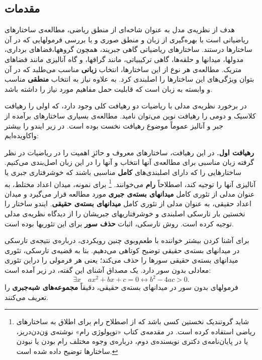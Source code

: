 \documentclass[12pt,a4paper]{article}
\theoremstyle{colorhead}
\begin{document}
\subsection{مقدمات}
هدف از
نظریه‌ی مدل 
به عنوان شاخه‌ای
از منطق ریاضی، مطالعه‌ی ساختارهای ریاضیاتی
است با بهره‌گیری از زبان و منطق صوری
 و با بررسی فرمولهایی که در آن ساختارها درستند. ساختارهای ریاضیاتی گاهی جبریند، همچون گروهها،‌فضاهای برداری، مدولها، میدانها و حلقه‌ها، گاهی
 ترکیبیاتی، مانند گرافها،‌ و گاه آنالیزی مانند فضاهای متریک. مطالعه‌ی هر نوع از این ساختارها، انتخاب
\textbf{ زبانی }
مناسب می‌طلبد که در آن بتوان ویژگی‌های این ساختارها را اصلبندی کرد. 
به علاوه نیاز به انتخاب 
\textbf{منطقی}
مناسب و وابسته به زبان است
 که 
قابلیت حمل مفاهیم مورد نیاز را داشته باشد.
\par 
در برخورد نظریه‌ی مدلی با ریاضیات دو رهیافت کلی وجود دارد، که اولی را  رهیافت کلاسیک و دومی را رهیافت نوین 
می‌توان
نامید. مطالعه‌ی بسیاری ساختارهای برآمده از جبر و آنالیز عموماً موضوع رهیافت نخست بوده است. در زیر ایندو را بیشتر واکاویده‌ایم:
\par \noindent
\textbf{رهیافت اول. }
در این رهیافت، ساختارهای معروف و حائزِ اهمیت را در ریاضیات در نظر گرفته زبان مناسبی برای مطالعه‌ی آنها انتخاب و آنها را در این زبان اصل‌بندی می‌کنیم. 
ساختارهایی را که دارای اصلبندی‌های \textbf{کامل}
مناسبی باشند که خوشرفتاری جبری یا آنالیزی آنها را توجیه کند، اصطلاحاً 
\textbf{رام}
می‌خوانند. 
\footnote{شاید 
گروتندیک نخستین کسی باشد که 
از اصطلاح رام
برای اطلاق به ساختارهای ریاضی استفاده کرده است. 
در مقدمه‌ی کتاب «توپولوژی رام» نوشته‌ی وَن‌دن‌دریز، یا در پایان‌نامه‌ی دکتری نویسنده‌ی دوم، درباره‌ی 
وجوه مختلف
رام بودن یا نبودن ساختارها توضیح داده شده است. 
}
برای نمونه، میدان اعداد مختلط، به عنوان مدلی از تئوری‌ کامل 
\textbf{میدانهای بسته‌ی جبری}
مورد مطالعه قرار می‌گیرد و میدان اعداد حقیقی، به عنوان مدلی از تئوری کامل
\textbf{میدانهای بسته‌ی حقیقی}.
ایندو ساختار را نخستین بار تارسکی اصلبندی و خوشرفتاریهای جبریشان را از دیدگاه نظریه‌ی مدلی توجیه کرده است. روش تارسکی، اثبات 
\textbf{حذف سور}
برای این تئوریها بوده است. 
\par 
برای آشنا کردن بیشتر خواننده با طعم‌وبوی چنین رویکردی، درباره‌ی 
نتیجه‌ی
تارسکی در
میدانهای بسته‌ی حقیقی توضیح کوتاهی می‌دهیم. بنا به قضیه‌ی تارسکی، تئوری میدانهای بسته‌ی حقیقی سورها را حذف می‌کند؛ 
یعنی هر فرمولی را دراین تئوری معادلی بدون سور دارد. یک مصداق آشنای این گفته، در زیر آمده است:
\[
\exists x\quad ax^2+bx+c=0\leftrightarrow b^2-4ac>0.
\]
فرمولهای بدون سور در میدانهای بسته‌ی حقیقی، دقیقاً 
\textbf{مجموعه‌های شبه‌جبری }
را تعریف می‌کنند.
\end{document}
